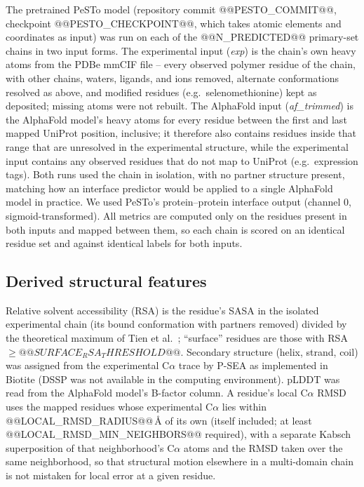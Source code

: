 \documentclass[10pt]{article}
\begin{document}
The pretrained PeSTo model (repository commit @@PESTO_COMMIT@@, checkpoint
@@PESTO_CHECKPOINT@@, which takes atomic elements and coordinates as input)
was run on each of the @@N_PREDICTED@@ primary-set chains in two input forms.
The experimental input (\emph{exp}) is the chain's own heavy atoms from the
PDBe mmCIF file -- every observed polymer residue of the chain, with other
chains, waters, ligands, and ions removed, alternate conformations resolved
as above, and modified residues (e.g.\ selenomethionine) kept as deposited;
missing atoms were not rebuilt. The AlphaFold input (\emph{af\_trimmed}) is
the AlphaFold model's heavy atoms for every residue between the first and
last mapped UniProt position, inclusive; it therefore also contains residues
inside that range that are unresolved in the experimental structure, while
the experimental input contains any observed residues that do not map to
UniProt (e.g.\ expression tags). Both runs used the chain in isolation, with
no partner structure present, matching how an interface predictor would be
applied to a single AlphaFold model in practice. We used PeSTo's
protein--protein interface output (channel 0, sigmoid-transformed). All
metrics are computed only on the residues present in both inputs and mapped
between them, so each chain is scored on an identical residue set and against
identical labels for both inputs.

\subsection{Derived structural features}
\label{sec:features}

Relative solvent accessibility (RSA) is the residue's SASA in the isolated
experimental chain (its bound conformation with partners removed) divided by
the theoretical maximum of Tien et al.\ \cite{tien2013}; ``surface'' residues
are those with RSA $\geq @@SURFACE_RSA_THRESHOLD@@$. Secondary structure
(helix, strand, coil) was assigned from the experimental C$\alpha$ trace by
P-SEA \cite{labesse1997} as implemented in Biotite (DSSP was not available
in the computing environment). pLDDT was read from the AlphaFold model's
B-factor column. A residue's local C$\alpha$ RMSD uses the mapped residues
whose experimental C$\alpha$ lies within @@LOCAL_RMSD_RADIUS@@\,\r{A} of its
own (itself included; at least @@LOCAL_RMSD_MIN_NEIGHBORS@@ required), with a
separate Kabsch superposition of that neighborhood's C$\alpha$ atoms and the
RMSD taken over the same neighborhood, so that structural motion elsewhere in
a multi-domain chain is not mistaken for local error at a given residue.
\end{document}

